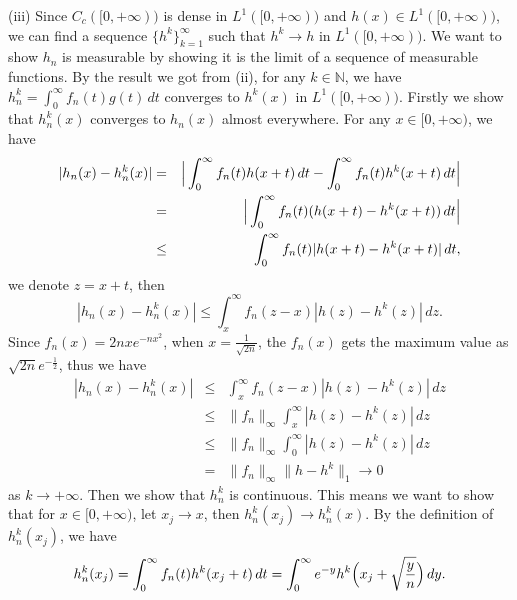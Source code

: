\documentclass[12pt,a4paper]{ctexart}
\begin{document}
\vspace{8pt}

(iii) Since $C_{c}([0, + \infty))$ is dense in $L^{1}([0, + \infty))$ and $h(x) \in L^{1}([0, + \infty))$, we can find a sequence $\{h^{k}\}_{k = 1}^{\infty}$ such that $h^{k} \to h$ in $L^{1}([0, + \infty))$. We want to show $h_{n}$ is measurable by showing it is the limit of a sequence of measurable functions. By the result we got from (ii), for any $k \in \mathbb{N}$, we have $h_{n}^{k} = \int_{0}^{\infty} f_{n}(t) g(t) \, d t$ converges to $h^{k}(x)$ in $L^{1}([0, + \infty))$. Firstly we show that $h_{n}^{k} (x)$ converges to $h_{n} (x)$ almost everywhere. For any $x \in [0, + \infty)$, we have
\begin{eqnarray*}
|h_{n}(x) - h_{n}^{k} (x)|  & = & \Big{|} \int_{0}^{\infty} f_{n} (t) h(x + t) \, d t - \int_{0}^{\infty} f_{n} (t) h^{k}(x + t) \, d t \Big{|} \\
 & = & \Big{|} \int_{0}^{\infty} f_{n} (t) ( h(x + t) - h^{k}(x + t)) \, d t \Big{|} \\
 & \leq & \int_{0}^{\infty} f_{n} (t) | h(x + t) - h^{k}(x + t)| \, d t,
\end{eqnarray*}
we denote $z = x + t$, then
\begin{equation*}
    |h_{n}(x) - h_{n}^{k} (x)| \leq \int_{x}^{\infty} f_{n} (z - x) | h(z) - h^{k}(z)| \, d z.
\end{equation*}
Since $f_{n}(x) = 2 n x e^{-n x^{2}}$, when $x = \frac{1}{\sqrt{2n}}$, the $f_{n}(x)$ gets the maximum value as $\sqrt{2n} e^{-\frac{1}{2}}$, thus we have
\begin{eqnarray*}
|h_{n}(x) - h_{n}^{k} (x)|  & \leq & \int_{x}^{\infty} f_{n} (z - x) | h(z) - h^{k}(z)| \, d z \\
 & \leq  & \|f_{n}\|_{\infty} \int_{x}^{\infty} |h(z) - h^{k} (z)| \, d z \\
 & \leq & \|f_{n}\|_{\infty} \int_{0}^{\infty} |h(z) - h^{k} (z)| \, d z \\
 & = & \|f_{n}\|_{\infty}  \|h - h^{k}\|_{1} \to 0
\end{eqnarray*}
as $k \to + \infty$. Then we show that $h_{n}^{k}$ is continuous. This means we want to show that for $x \in [0, + \infty)$, let $x_{j} \to x$, then $h_{n}^{k} (x_{j}) \to h_{n}^{k} (x)$. By the definition of $h_{n}^{k} (x_{j})$, we have
\begin{equation*}
    h_{n}^{k} (x_{j}) = \int_{0}^{\infty} f_{n}(t) h^{k}(x_{j} + t) \, d t = \int_{0}^{\infty} e^{-y} h^{k} \Big{(} x_{j} + \sqrt{\frac{y}{n}} \Big{)} \, d y.
\end{equation*}
\end{document}

